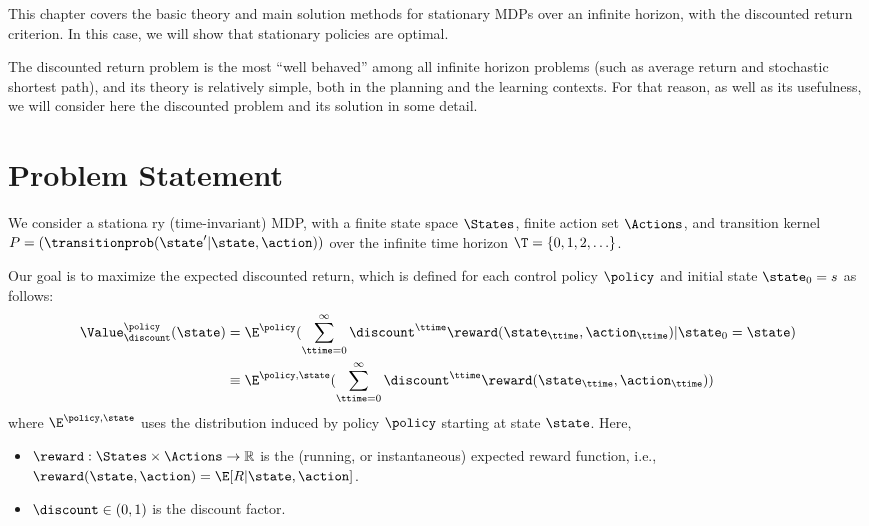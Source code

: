 This chapter covers the basic theory and main solution methods for
stationary MDPs over an infinite horizon, with the discounted return
criterion. In this case, we will show that stationary policies are
optimal.

The discounted return problem is the most ``well behaved'' among all
infinite horizon problems (such as average return and stochastic
shortest path), and its theory is relatively simple, both in
the planning and the learning contexts. For that reason, as well as
its usefulness, we will consider here the discounted problem and its
solution in some detail.


\section{Problem Statement} \label{sec:inf_horizon_prob}

We consider a stationa ry (time-invariant) MDP, with a finite state
space $\States$, finite action set $\Actions$, and transition kernel
$P = (\transitionprob(\state'|\state,\action))$ over the infinite time horizon
${\T} = \{ 0,1,2, \ldots \} $.

Our goal is to maximize the expected discounted return, which is
defined for each control policy $\policy $ and initial state
${\state_0} = s$ as follows:
\begin{align*}
\Value_\discount ^\policy (\state) &= {\E^\policy }(\sum\limits_{\ttime = 0}^\infty  {{\discount ^\ttime}\reward({\state_\ttime},{\action_\ttime})} |{\state_0} = \state)\\
 &\equiv {\E^{\policy ,\state}}(\sum\limits_{\ttime = 0}^\infty  {{\discount ^\ttime}\reward({\state_\ttime},{\action_\ttime})} )
\end{align*}
where $\E^{\policy ,\state}$ uses the distribution induced by policy
$\policy$ starting at state $\state$. Here,
\begin{itemize}
  \item $\reward : \States \times \Actions \to \mathbb R$ is the (running, or instantaneous) expected reward function, i.e., $\reward(\state,\action)=\E[R|\state,\action]$.
  \item $\discount  \in (0,1)$ is the discount factor.
\end{itemize}

